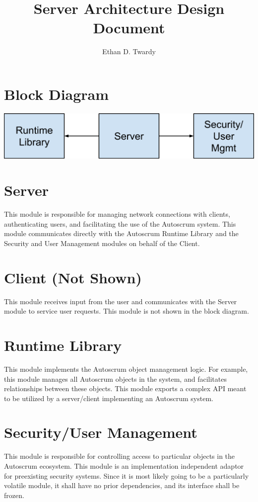 \documentclass[12pt]{article}
\title{Server Architecture Design Document}
\author{Ethan D. Twardy}
\begin{document}
\maketitle
\pagebreak

\section{Block Diagram}
\includegraphics[width=\textwidth]{arch.png}

\section{Server}
This module is responsible for managing network connections with clients,
authenticating users, and facilitating the use of the Autoscrum system. This
module communicates directly with the Autoscrum Runtime Library and the
Security and User Management modules on behalf of the Client.

\section{Client (Not Shown)}
This module receives input from the user and communicates with the Server
module to service user requests. This module is not shown in the block diagram.

\section{Runtime Library}
This module implements the Autoscrum object management logic. For example, this
module manages all Autoscrum objects in the system, and facilitates
relationships between these objects. This module exports a complex API meant to
be utilized by a server/client implementing an Autoscrum system.

\section{Security/User Management}
This module is responsible for controlling access to particular objects in the
Autoscrum ecosystem. This module is an implementation independent adaptor for
preexisting security systems. Since it is most likely going to be a
particularly volatile module, it shall have no prior dependencies, and its
interface shall be frozen.
\end{document}
